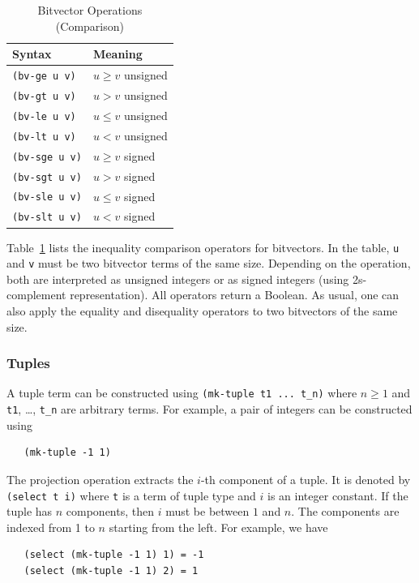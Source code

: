 \documentclass[11pt,twoside,fleqn,openright,titlepage]{cslreport}
\begin{document}
\begin{table}
\begin{small}
\begin{center}
\begin{tabular}{|p{3cm}|l|}
\hline
Syntax & Meaning \\
\hline
\texttt{(bv-ge u v)} & $u \geq v$ unsigned\\
\texttt{(bv-gt u v)} & $u > v$ unsigned \\
\texttt{(bv-le u v)} & $u \leq v$ unsigned \\
\texttt{(bv-lt u v)} & $u < v$ unsigned \\
\hline
\texttt{(bv-sge u v)} & $u \geq v$ signed\\
\texttt{(bv-sgt u v)} & $u > v$ signed \\
\texttt{(bv-sle u v)} & $u \leq v$ signed \\
\texttt{(bv-slt u v)} & $u < v$ signed \\
\hline
\end{tabular}
\end{center}
\end{small}
\caption{Bitvector Operations (Comparison)}
\label{bitvectors5}
\end{table}

Table~\ref{bitvectors5} lists the inequality comparison operators for
bitvectors. In the table, \texttt{u} and \texttt{v} must be two
bitvector terms of the same size. Depending on the operation, both are
interpreted as unsigned integers or as signed integers (using
2s-complement representation).  All operators return a Boolean. As
usual, one can also apply the equality and disequality operators to
two bitvectors of the same size.


\subsubsection*{Tuples}

A tuple term can be constructed using \texttt{(mk-tuple t1 ... t\_n)}
where $n\geq1$ and \texttt{t1}, \ldots, \texttt{t\_n} are arbitrary
terms. For example, a pair of integers can be constructed using
\begin{small}
\begin{verbatim}
   (mk-tuple -1 1)
\end{verbatim}
\end{small}

\medskip\noindent The projection operation extracts the $i$-th
component of a tuple. It is denoted by \texttt{(select t i)} where
\texttt{t} is a term of tuple type and $i$ is an integer constant.  If
the tuple has $n$ components, then $i$ must be between $1$ and
$n$. The components are indexed from 1 to $n$ starting from the
left. For example, we have
\begin{small}
\begin{verbatim}
   (select (mk-tuple -1 1) 1) = -1
   (select (mk-tuple -1 1) 2) = 1
\end{verbatim}
\end{small}
\end{document}

